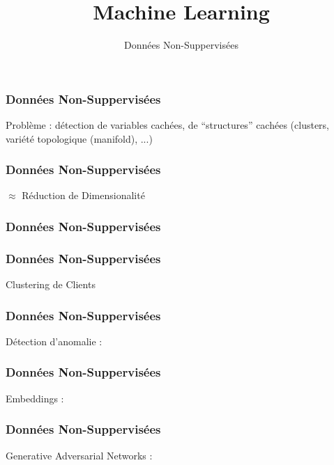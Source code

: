 \documentclass{formation}
\title{Machine Learning}
\subtitle{Données Non-Suppervisées}
\begin{document}
\maketitle

\begin{frame}
  \frametitle{Données Non-Suppervisées}
  Problème : détection de variables cachées, de ``structures'' cachées (clusters, variété topologique (manifold), ...) \\ $\;$ \\
  \begin{minipage}[l]{0.69\linewidth}
  \end{minipage}\hfill
  \begin{minipage}[l]{0.29\linewidth}
  \end{minipage}\hfill
\end{frame}

\begin{frame}
  \frametitle{Données Non-Suppervisées}
  \begin{center}
    $\approx$ Réduction de Dimensionalité
  \end{center}
\end{frame}

\begin{frame}
  \frametitle{Données Non-Suppervisées}
  \begin{minipage}[l]{0.69\linewidth}
  \end{minipage}\hfill
  \begin{minipage}[l]{0.29\linewidth}
  \end{minipage}\hfill
\end{frame}

\begin{frame}
  \frametitle{Données Non-Suppervisées}
  Clustering de Clients
\end{frame}

\begin{frame}
  \frametitle{Données Non-Suppervisées}
  Détection d'anomalie :
\end{frame}

\begin{frame}
  \frametitle{Données Non-Suppervisées}
  Embeddings :
\end{frame}

\begin{frame}
  \frametitle{Données Non-Suppervisées}
  \begin{center}
    Generative Adversarial Networks :
    \end{center}
  \begin{minipage}[l]{0.49\linewidth}
  \end{minipage}\hfill
  \begin{minipage}[l]{0.49\linewidth}
  \end{minipage}\hfill
\end{frame}
\end{document}
